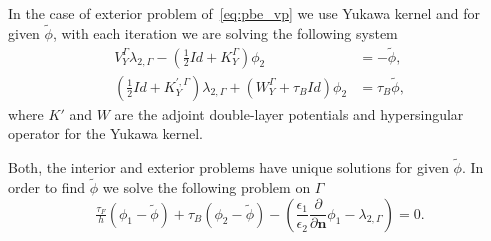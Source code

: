 \begin{itemize}
In the case of exterior problem of~\eqref{eq:pbe_vp} we use Yukawa kernel and 
for given $\widetilde{\phi}$, with each iteration we are solving the following system
\begin{align*}
V_{Y}^{\Gamma} \lambda_{2,\Gamma}  - \left( \tfrac{1}{2}Id + K_{Y}^{\Gamma}  \right) \phi_2 &= - \widetilde{\phi},  \\
 \left( \tfrac{1}{2} Id +  K_{Y}^{',\Gamma}\right)  \lambda_{2,\Gamma} + \left(W_{Y}^{\Gamma} + \tau_B Id\right)  \phi_2  &= \tau_B \widetilde{\phi},
\end{align*}
where $K'$ and $W$ are the adjoint double-layer potentials and hypersingular operator for the Yukawa kernel.

Both, the interior and exterior problems have unique solutions for given $\widetilde{\phi}$. In order to find $\widetilde{\phi}$ we solve the following problem on $\Gamma$
\begin{equation*}
\tfrac{\tau_F}{h} \left( \phi_1 - \widetilde{\phi}\right) + \tau_B \left( \phi_2 - \widetilde{\phi}\right)  - \left(\frac{\epsilon_1}{\epsilon_2} \frac{\partial}{\partial \mathbf{n}} \phi_1 -\lambda_{2,\Gamma} \right)  = 0.
\end{equation*}
\end{itemize}
